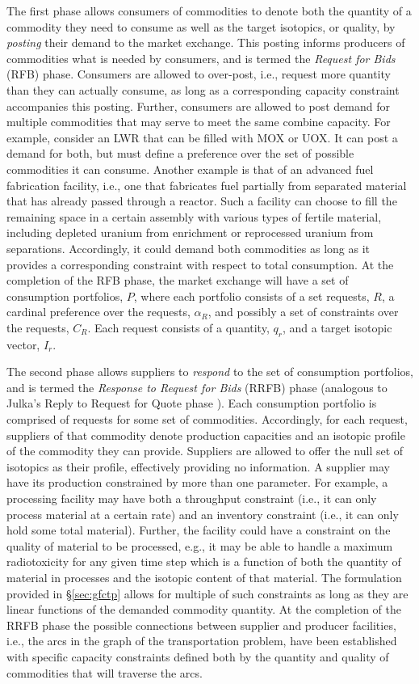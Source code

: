 The first phase allows consumers of commodities to denote both the quantity of a
commodity they need to consume as well as the target isotopics, or quality, by
\textit{posting} their demand to the market exchange. This posting informs
producers of commodities what is needed by consumers, and is termed the
\textit{Request for Bids} (RFB) phase. Consumers are allowed to over-post, i.e.,
request more quantity than they can actually consume, as long as a corresponding
capacity constraint accompanies this posting. Further, consumers are allowed to
post demand for multiple commodities that may serve to meet the same combine
capacity. For example, consider an LWR that can be filled with MOX or UOX. It
can post a demand for both, but must define a preference over the set of
possible commodities it can consume. Another example is that of an advanced fuel
fabrication facility, i.e., one that fabricates fuel partially from separated
material that has already passed through a reactor. Such a facility can choose
to fill the remaining space in a certain assembly with various types of fertile
material, including depleted uranium from enrichment or reprocessed uranium from
separations. Accordingly, it could demand both commodities as long as it
provides a corresponding constraint with respect to total consumption. At the
completion of the RFB phase, the market exchange will have a set of consumption
portfolios, $P$, where each portfolio consists of a set requests, $R$, a
cardinal preference over the requests, $\alpha_R$, and possibly a set of
constraints over the requests, $C_R$. Each request consists of a quantity,
$q_r$, and a target isotopic vector, $I_r$.

The second phase allows suppliers to \textit{respond} to the set of consumption
portfolios, and is termed the \textit{Response to Request for Bids} (RRFB) phase
(analogous to Julka's Reply to Request for Quote phase
\cite{julka_agent-based_2002}). Each consumption portfolio is comprised of
requests for some set of commodities. Accordingly, for each request, suppliers
of that commodity denote production capacities and an isotopic profile of the
commodity they can provide. Suppliers are allowed to offer the null set of
isotopics as their profile, effectively providing no information. A supplier may
have its production constrained by more than one parameter. For example, a
processing facility may have both a throughput constraint (i.e., it can only
process material at a certain rate) and an inventory constraint (i.e., it can
only hold some total material). Further, the facility could have a constraint on
the quality of material to be processed, e.g., it may be able to handle a
maximum radiotoxicity for any given time step which is a function of both the
quantity of material in processes and the isotopic content of that material. The
formulation provided in \S\ref{sec:gfctp} allows for multiple of such
constraints as long as they are linear functions of the demanded commodity
quantity. At the completion of the RRFB phase the possible connections between
supplier and producer facilities, i.e., the arcs in the graph of the
transportation problem, have been established with specific capacity constraints
defined both by the quantity and quality of commodities that will traverse the
arcs.

